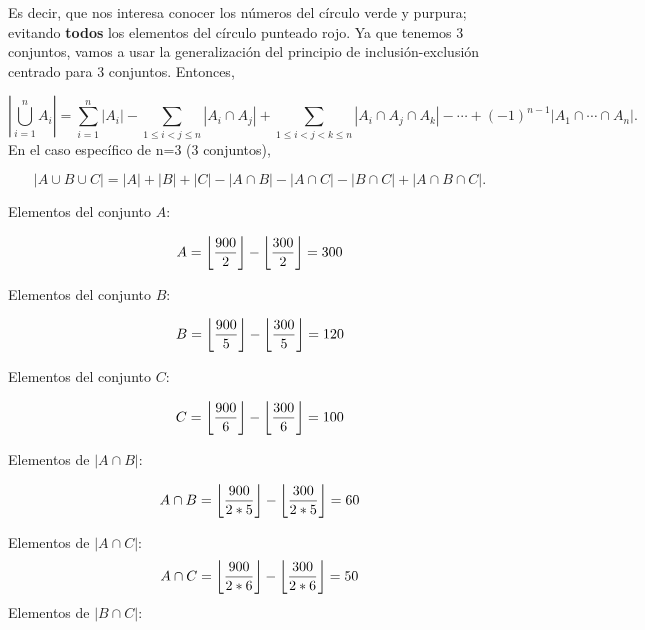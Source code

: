 \begin{solution}
\begin{center}
\end{center}
Es decir, que nos interesa conocer los números del círculo verde y purpura; evitando \textbf{todos} los elementos del círculo punteado rojo. Ya que tenemos 3 conjuntos, vamos a usar la generalización del principio de inclusión-exclusión centrado para 3 conjuntos. Entonces,

$$\left|\bigcup_{i=1}^n A_i\right| = \sum_{i=1}^n |A_i| - \sum_{1 \leqslant i < j \leqslant n} |A_i\cap A_j| + \sum_{1 \leqslant i < j < k \leqslant n} |A_i \cap A_j\cap A_k| - \cdots + (-1)^{n-1} \left|A_1\cap\cdots\cap A_n\right|.$$
En el caso específico de n=3 (3 conjuntos), 

$$|A \cup B \cup C| = |A| + |B| + |C| - |A \cap B| - |A \cap C| - |B \cap C| + |A \cap B \cap C|.$$


\linita 

Elementos del conjunto $A$: 

$$A=\floor*{\frac{900}{2}}-\floor*{\frac{300}{2}}=300$$

Elementos del conjunto $B$: 

$$B=\floor*{\frac{900}{5}}-\floor*{\frac{300}{5}}=120$$

Elementos del conjunto $C$: 

$$C=\floor*{\frac{900}{6}}-\floor*{\frac{300}{6}}=100$$

\linita 

Elementos de $|A\cap B|$: 

$$A\cap B=\floor*{\frac{900}{2*5}}-\floor*{\frac{300}{2*5}}=60$$

Elementos de $|A\cap C|$: 
$$A\cap C=\floor*{\frac{900}{2*6}}-\floor*{\frac{300}{2*6}}=50$$
\newpage
Elementos de $|B\cap C|$: 


\end{solution}
